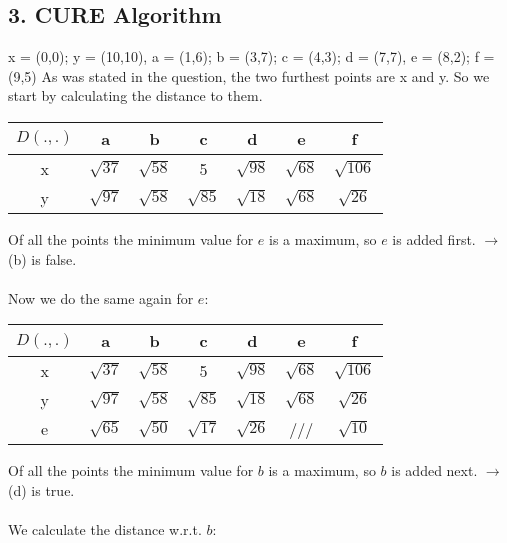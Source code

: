 \documentclass[11pt,a4paper]{article}
\begin{document}
\subsection*{3. CURE Algorithm}
x = (0,0); y = (10,10), a = (1,6); b = (3,7); c = (4,3); d = (7,7), e = (8,2); f = (9,5)
As was stated in the question, the two furthest points are x and y. So we start by calculating the distance to them.
\begin{table}[H]
\centering
\def\arraystretch{1.2}
\begin{tabular}{|c|c|c|c|c|c|c|}

\hline 
$D(.,.)$ & a & b & c & d & e & f \\ 
\hline 
x & $\sqrt{37}$ & $\sqrt{58}$ & 5 & $\sqrt{98}$ & $\sqrt{68}$ & $\sqrt{106}$ \\ 
\hline 
y & $\sqrt{97}$ & $\sqrt{58}$ & $\sqrt{85}$ & $\sqrt{18}$ & $\sqrt{68}$ & $\sqrt{26}$ \\ 
\hline 
\end{tabular} 
\end{table}
\noindent
Of all the points the minimum value for $e$ is a maximum, so $e$ is added first. $\rightarrow$ (b) is false.
\\
\\
Now we do the same again for $e$:


\begin{table}[H]
\centering
\def\arraystretch{1.2}
\begin{tabular}{|c|c|c|c|c|c|c|}
\hline 
$D(.,.)$ & a & b & c & d & e & f \\ 
\hline 
x & $\sqrt{37}$ & $\sqrt{58}$ & 5 & $\sqrt{98}$ & $\sqrt{68}$ & $\sqrt{106}$ \\ 
\hline 
y & $\sqrt{97}$ & $\sqrt{58}$ & $\sqrt{85}$ & $\sqrt{18}$ & $\sqrt{68}$ & $\sqrt{26}$ \\ 
\hline
e & $\sqrt{65}$ & $\sqrt{50}$ & $\sqrt{17}$ & $\sqrt{26}$ & /// & $\sqrt{10}$ \\
\hline 
\end{tabular} 
\end{table}
\noindent
Of all the points the minimum value for $b$ is a maximum, so $b$ is added next. $\rightarrow$ (d) is true.
\\
\\
We calculate the distance w.r.t. $b$:
\end{document}
